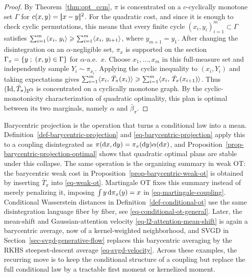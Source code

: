 \begin{proof}
	By Theorem~\ref{thm:opt_ccm}, $\pi$ is concentrated on a $c$-cyclically monotone set $\Gamma$ for $c(x,y)=|\!| x-y |\!|^2$. For the quadratic cost, and since it is enough to check cyclic permutations, this means that every finite cycle $(x_i,y_i)_{i=1}^m\subset\Gamma$ satisfies
	$\sum_{i=1}^m \langle x_i,\,y_i\rangle \geqslant \sum_{i=1}^m \langle x_i,\,y_{i+1}\rangle$, where $y_{m+1}=y_1$.
	After changing the disintegration on an $\alpha$-negligible set, $\pi_x$ is supported on the section
	\(\Gamma_x=\left\{ y \;;\; (x,y)\in\Gamma \right\}\)
	for $\alpha$-a.e.\ $x$.
	Choose $x_1,\ldots,x_m$ in this full-measure set and independently sample $Y_i\sim\pi_{x_i}$. Applying the cyclic inequality to $(x_i,Y_i)$ and taking expectations gives
	$\sum_{i=1}^m \langle x_i,\,\bar T_\pi(x_i)\rangle \geqslant \sum_{i=1}^m \langle x_i,\,\bar T_\pi(x_{i+1})\rangle$.
	Thus $(\mathrm{Id},\bar T_\pi)_\sharp\alpha$ is concentrated on a cyclically monotone graph. By the cyclic-monotonicity characterization of quadratic optimality, this plan is optimal between its two marginals, namely $\alpha$ and $\bar\beta_\pi$.
\end{proof}

\begin{rem}\label{rem-barycentric-projection-everywhere}
	Barycentric projection is the operation that turns a conditional law into a mean. Definition~\ref{def-barycentric-projection} and \eqref{eq-barycentric-projection} apply this to a coupling disintegrated as \(\pi(\mathrm{d} x,\mathrm{d} y)=\pi_x(\mathrm{d} y)\alpha(\mathrm{d} x)\), and Proposition~\ref{prop-barycentric-projection-optimal} shows that quadratic optimal plans are stable under this collapse. The same operation is the organizing summary in weak OT: the barycentric weak cost in Proposition~\ref{prop-barycentric-weak-ot} is obtained by inserting \(\bar T_\pi\) into \eqref{eq-weak-ot}. Martingale OT fixes this summary instead of merely penalizing it, imposing \(\int y\,\mathrm{d}\pi_x(y)=x\) in \eqref{eq-martingale-coupling}. Conditional Wasserstein distances in Definition~\ref{def-conditional-ot} use the same disintegration language fiber by fiber, see \eqref{eq-conditional-ot-general}. Later, the mean-shift and Gaussian-attention velocity \eqref{eq-l2-attention-mean-shift} is again a barycentric average, now of a kernel-weighted neighborhood, and SVGD in Section~\ref{sec-svgd-generative-flow} replaces this barycentric averaging by the RKHS steepest-descent average \eqref{eq-svgd-velocity}. Across these examples, the recurring move is to keep the conditional structure of a coupling but replace the full conditional law by a tractable first moment or kernelized moment.
\end{rem}

